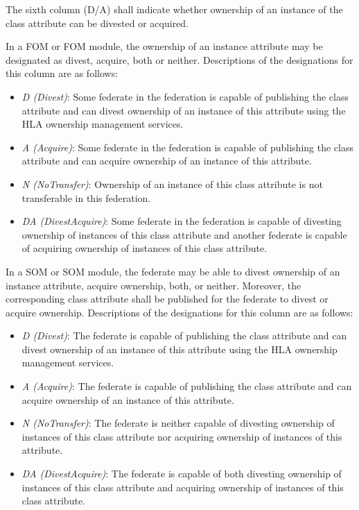 The sixth column (D/A) shall indicate whether ownership of an instance of the class attribute can be divested or acquired.

In a FOM or FOM module, the ownership of an instance attribute may be designated as divest, acquire, both or neither. Descriptions of the designations for this column are as follows:
\begin{itemize}[topsep=1pt,itemsep=2pt]
\item \textit{D (Divest)}: Some federate in the federation is capable of publishing the class attribute and can divest ownership of an instance of this attribute using the HLA ownership management services.
\item \textit{A (Acquire)}: Some federate in the federation is capable of publishing the class attribute and can acquire ownership of an instance of this attribute.
\item \textit{N (NoTransfer)}: Ownership of an instance of this class attribute is not transferable in this federation.
\item \textit{DA (DivestAcquire)}: Some federate in the federation is capable of divesting ownership of instances of this class attribute and another federate is capable of acquiring ownership of instances of this class attribute.
\end{itemize}

In a SOM or SOM module, the federate may be able to divest ownership of an instance attribute, acquire ownership, both, or neither. Moreover, the corresponding class attribute shall be published for the federate to divest or acquire ownership. Descriptions of the designations for this column are as follows:
\begin{itemize}[topsep=1pt,itemsep=2pt]
\item \textit{D (Divest)}: The federate is capable of publishing the class attribute and can divest ownership of an instance of this attribute using the HLA ownership management services.
\item \textit{A (Acquire)}: The federate is capable of publishing the class attribute and can acquire ownership of an instance of this attribute.
\item \textit{N (NoTransfer)}: The federate is neither capable of divesting ownership of instances of this class attribute nor acquiring ownership of instances of this attribute.
\item \textit{DA (DivestAcquire)}: The federate is capable of both divesting ownership of instances of this class attribute and acquiring ownership of instances of this class attribute.
\end{itemize}

